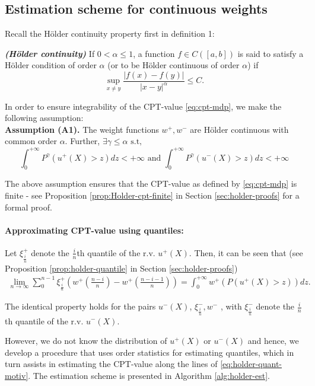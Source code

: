 \documentclass[11pt,letterpaper,english]{article}
\begin{document}
\subsection{Estimation scheme for \holder continuous weights}
Recall the H\"{o}lder continuity property first in definition 1:
\begin{definition}
{\textbf{\textit{(H\"{o}lder continuity)}}}
If $0 < \alpha \leq 1$, a function $f \in C([a,b])$ is said to satisfy
a H\"{o}lder condition of order $\alpha$ (or to be H\"{o}lder continuous
of order $\alpha$) if
\[
\sup_{x \neq y} \frac{| f(x) - f(y) |}{| x-y |^{\alpha}} \leq C .
\]
\end{definition}

In order to ensure integrability of the CPT-value \eqref{eq:cpt-mdp}, we make the following assumption:\\[1ex]
\textbf{Assumption (A1).}  
The weight functions $w^+, w^-$ are H\"{o}lder continuous with common order $\alpha$. Further,
$\exists \gamma \le \alpha \text{   s.t,  }$ 
$$\int_0^{+\infty} P^{\gamma} (u^+(X)>z) dz < +\infty \text{ and }\int_0^{+\infty} P^{\gamma} (u^-(X)>z) dz < +\infty$$

The above assumption ensures that the CPT-value as defined by \eqref{eq:cpt-mdp} is finite - see Proposition \ref{prop:Holder-cpt-finite} in Section \ref{sec:holder-proofs} for a formal proof.


\paragraph{Approximating CPT-value using quantiles:}
Let $\xi^+_{\frac{i}{n}}$ denote the $\frac{i}{n}$th quantile of the r.v. $u^+(X)$. Then, it can be seen that (see Proposition \ref{prop:holder-quantile} in Section \ref{sec:holder-proofs})
\begin{align}
\label{eq:holder-quant-motiv}
\lim_{n \rightarrow \infty} \sum_0^{n-1} \xi^+_{\frac{i}{n}} \left(w^+\left(\frac{n-i}{n}\right)- w^+\left(\frac{n-i-1}{n}\right) \right) = \int_0^{+\infty} w^+(P(u^+(X)>z)) dz.
\end{align}

The identical property holds for the pairs $u^-(X)$, $\xi^-_{\frac{i}{n}}, w^-$ , with $\xi^-_{\frac{i}{n}}$ denote the 
$\frac{i}{n}$th quantile of the r.v. $u^-(X)$.

However, we do not know the distribution of $u^+(X)$ or $u^-(X)$ and hence, we develop a procedure that uses order statistics for estimating quantiles, which in turn assists in estimating the CPT-value along the lines of \eqref{eq:holder-quant-motiv}. The estimation scheme is presented in Algorithm \ref{alg:holder-est}.
\end{document}
